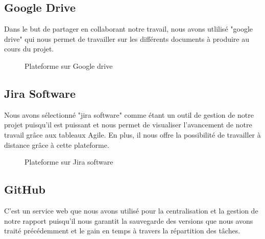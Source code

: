 	\subsection{Google Drive}
	Dans le but de partager en collaborant notre travail, nous avons utlilisé "google drive" qui nous permet de travailler sur les différents documents à produire au cours du projet.
	\begin{figure}[H]
		\begin{center}
			\centering
		\end{center}
		\caption{Plateforme sur Google drive}
	\end{figure}
	\subsection{Jira Software}
	Nous avons sélectionné "jira software" comme étant un outil de gestion de notre projet puisqu'il est  puissant et nous permet de visualiser l'avancement de notre travail grâce aux tableaux Agile. En plus, il nous offre la possibilité de travailler à distance grâce à cette plateforme.
	\begin{figure}[h]
		\begin{center}
			\centering
		\end{center}
		\caption{Plateforme sur Jira software}
	\end{figure}
	\subsection{GitHub}
	C'est un service web que nous avons utilisé pour la centralisation et la gestion de notre rapport puisqu'il nous garantit la sauvegarde des versions  que nous avons traité précédemment et le gain en temps à travers la répartition des tâches.  
	
